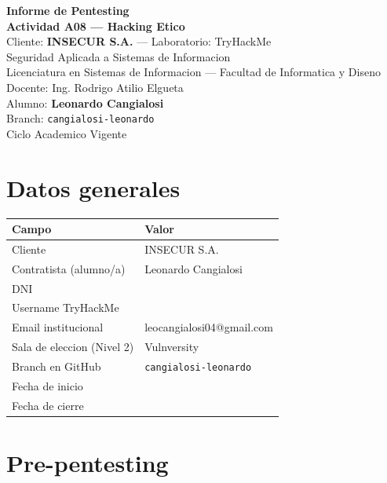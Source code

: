 \documentclass[11pt,a4paper]{article}
\begin{document}
\begin{titlepage}
\centering
\vspace*{2cm}
{\Large\bfseries Informe de Pentesting}\\[0.3cm]
{\Large\bfseries Actividad A08 --- Hacking Etico}\\[1cm]
{\large Cliente: \textbf{INSECUR S.A.} --- Laboratorio: TryHackMe}\\[2cm]
{\large Seguridad Aplicada a Sistemas de Informacion}\\
Licenciatura en Sistemas de Informacion --- Facultad de Informatica y Diseno\\
Docente: Ing. Rodrigo Atilio Elgueta\\[1cm]
{\large Alumno: \textbf{Leonardo Cangialosi}}\\[0.3cm]
Branch: \texttt{cangialosi-leonardo}\\[2cm]
\vfill
{\small Ciclo Academico Vigente}
\end{titlepage}

\tableofcontents
\newpage

\section{Datos generales}

\begin{center}
\renewcommand{\arraystretch}{1.6}
\begin{tabularx}{\textwidth}{@{} p{5cm} X @{}}
\toprule
\textbf{Campo} & \textbf{Valor} \\
\midrule
Cliente & INSECUR S.A. \\
Contratista (alumno/a) & Leonardo Cangialosi \\
DNI & \dotfill \\
Username TryHackMe & \dotfill \\
Email institucional & leocangialosi04@gmail.com \\
Sala de eleccion (Nivel 2) & Vulnversity \\
Branch en GitHub & \texttt{cangialosi-leonardo} \\
Fecha de inicio & \dotfill \\
Fecha de cierre & \dotfill \\
\bottomrule
\end{tabularx}
\end{center}

\section{Pre-pentesting}
\end{document}

